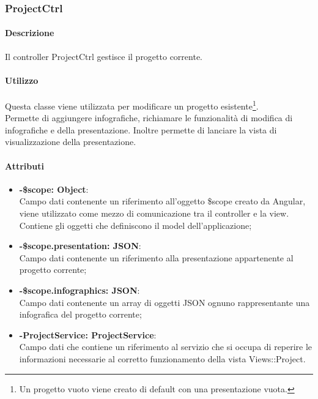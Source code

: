 \subsubsection{ProjectCtrl}
	\paragraph{Descrizione}
	Il controller ProjectCtrl gestisce il progetto corrente.
	
	\paragraph{Utilizzo}
	Questa classe viene utilizzata per modificare un progetto esistente\footnote{Un progetto vuoto viene creato di default con una presentazione vuota.}.\\
	Permette di aggiungere infografiche, richiamare le funzionalità di modifica di infografiche e della presentazione. Inoltre permette di lanciare la vista di visualizzazione della presentazione.
	\paragraph{Attributi}
	\begin{itemize}
		\item \textbf{-\$scope: Object}:\\
			Campo dati contenente un riferimento all'oggetto \$scope creato da Angular, viene utilizzato come mezzo di comunicazione tra il controller e la view. Contiene gli oggetti che definiscono il model dell'applicazione;
		\item \textbf{-\$scope.presentation: JSON}:\\
			Campo dati contenente un riferimento alla presentazione appartenente al progetto corrente;
		\item \textbf{-\$scope.infographics: JSON}:\\
			Campo dati contenente un array di oggetti JSON ognuno rappresentante una infografica del progetto corrente;	
		\item \textbf{-ProjectService: ProjectService}:\\
			Campo dati che contiene un riferimento al servizio che si occupa di reperire le informazioni necessarie al corretto funzionamento della vista Views::Project.
	\end{itemize}
	
